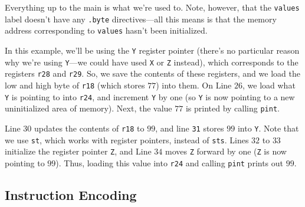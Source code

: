 Everything up to the main is what we're used to. Note, however, that the \verb!values! label doesn't have any \verb!.byte! directives---all this means is that the memory address corresponding to \verb!values! hasn't been initialized.

In this example, we'll be using the \verb!Y! register pointer (there's no particular reason why we're using \verb!Y!---we could have used \verb!X! or \verb!Z! instead), which corresponds to the registers \verb!r28! and \verb!r29!. So, we save the contents of these registers, and we load the low and high byte of \verb!r18! (which stores $77$) into them. On Line $26$, we load what \verb!Y! is pointing to into \verb!r24!, and increment \verb!Y! by one (so \verb!Y! is now pointing to a new uninitialized area of memory). Next, the value $77$ is printed by calling \verb!pint!.

Line $30$ updates the contents of \verb!r18! to $99$, and line \verb!31! stores $99$ into \verb!Y!. Note that we use \verb!st!, which works with register pointers, instead of \verb!sts!. Lines $32$ to $33$ initialize the register pointer \verb!Z!, and Line $34$ moves \verb!Z! forward by one (\verb!Z! is now pointing to $99$). Thus, loading this value into \verb!r24! and calling \verb!pint! prints out $99$.

\subsection{Instruction Encoding}


